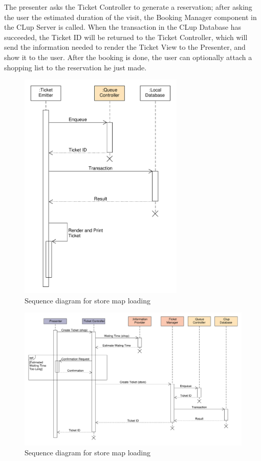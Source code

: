 The presenter asks the Ticket Controller to generate a reservation; after asking the user the estimated duration of the visit, the Booking Manager component in the CLup Server is called.
When the transaction in the CLup Database has succeeded, the Ticket ID will be returned to the Ticket Controller, which will send the information needed to render the Ticket View to the Presenter, and show it to the user. After the booking is done, the user can optionally attach a shopping list to the reservation he just made.
\begin{figure}[H]
    \includegraphics[width=0.7\textwidth]{Images/UML_paper_ticket_sequence.pdf}
    \caption{\label{fig:UML_paper_ticket_sequence}Sequence diagram for store map loading}
\end{figure}
\begin{figure}[H]
    \includegraphics[width=\textwidth]{Images/UML_virtual_ticket_sequence.pdf}
    \caption{\label{fig:UML_virtual_ticket_sequence}Sequence diagram for store map loading}
\end{figure}

